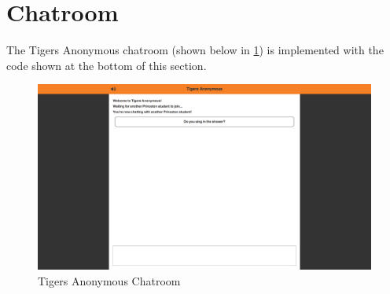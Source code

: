 \lstset{language=HTML}


\section{Chatroom}

The Tigers Anonymous chatroom (shown below in \ref{fig:TAChatRoom}) is implemented with the code shown at the bottom of this section.

\begin{figure}[h]
\centering
\includegraphics[trim= 35mm 0mm 35mm 0mm, clip, scale=0.25]{./Figures/TAChatroom}
\caption{Tigers Anonymous Chatroom}
\label{fig:TAChatRoom}
\end{figure}

\lstset{language=HTML}

